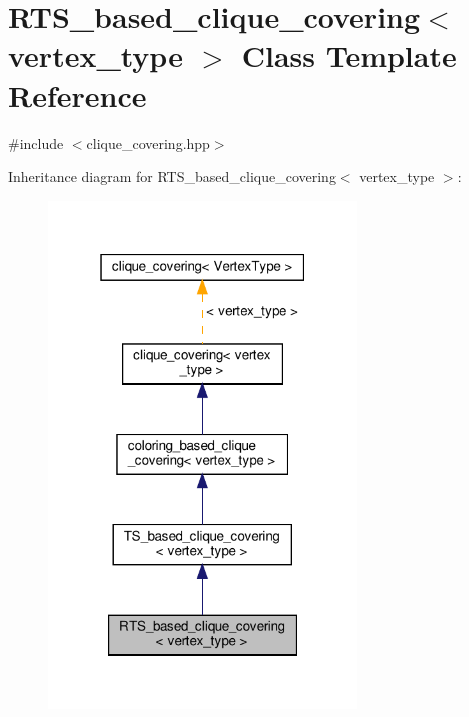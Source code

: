 \hypertarget{classRTS__based__clique__covering}{}\section{R\+T\+S\+\_\+based\+\_\+clique\+\_\+covering$<$ vertex\+\_\+type $>$ Class Template Reference}
\label{classRTS__based__clique__covering}


{\ttfamily \#include $<$clique\+\_\+covering.\+hpp$>$}



Inheritance diagram for R\+T\+S\+\_\+based\+\_\+clique\+\_\+covering$<$ vertex\+\_\+type $>$\+:
\nopagebreak
\begin{figure}[H]
\begin{center}
\leavevmode
\includegraphics[width=232pt]{dc/d1b/classRTS__based__clique__covering__inherit__graph}
\end{center}
\end{figure}


